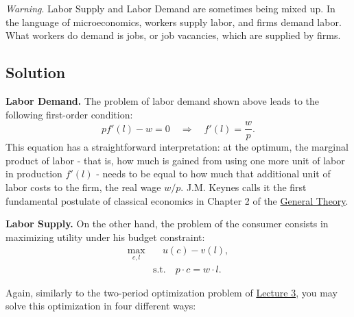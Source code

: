 \documentclass[]{book}
\theoremstyle{definition}
\theoremstyle{definition}
\theoremstyle{definition}
\theoremstyle{remark}
\begin{document}
\emph{Warning}. Labor Supply and Labor Demand are sometimes being mixed
up. In the language of microeconomics, workers supply labor, and firms
demand labor. What workers do demand is jobs, or job vacancies, which
are supplied by firms.

\subsection{Solution}\label{solution-3}

\textbf{Labor Demand.} The problem of labor demand shown above leads to
the following first-order condition:
\[pf'(l)-w = 0 \quad \Rightarrow \quad f'(l)=\frac{w}{p}.\] This
equation has a straightforward interpretation: at the optimum, the
marginal product of labor - that is, how much is gained from using one
more unit of labor in production \(f'(l)\) - needs to be equal to how
much that additional unit of labor costs to the firm, the real wage
\(w/p\). J.M. Keynes calls it the first fundamental postulate of
classical economics in Chapter 2 of the
\href{http://cas2.umkc.edu/economics/people/facultypages/kregel/courses/econ645/winter2011/generaltheory.pdf}{General
Theory}.

\textbf{Labor Supply.} On the other hand, the problem of the consumer
consists in maximizing utility under his budget constraint: \[
\begin{aligned}
\max_{c,l}& \quad u(c)-v(l),\\
&\text{s.t.}\quad p \cdot c = w \cdot l.
\end{aligned}
\]

Again, similarly to the two-period optimization problem of
\protect\hyperlink{two-period}{Lecture 3}, you may solve this
optimization in four different ways:
\end{document}
